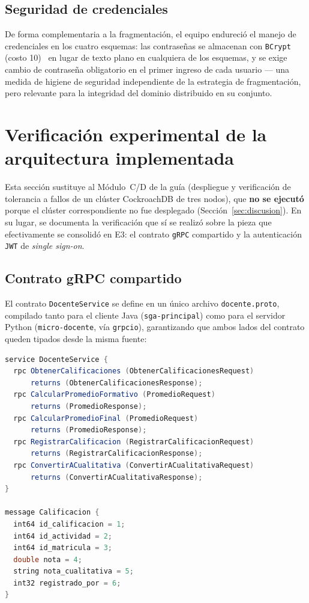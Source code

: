 \documentclass[12pt,a4paper]{article}
\begin{document}
\subsection{Seguridad de credenciales}

De forma complementaria a la fragmentación, el equipo endureció el manejo
de credenciales en los cuatro esquemas: las contraseñas se almacenan con
\texttt{BCrypt} (costo 10)~\cite{provos1999bcrypt} en lugar de texto plano
en cualquiera de los esquemas, y se exige cambio de contraseña obligatorio
en el primer ingreso de cada usuario --- una medida de higiene de seguridad
independiente de la estrategia de fragmentación, pero relevante para la
integridad del dominio distribuido en su conjunto.


\section{Verificación experimental de la arquitectura implementada}
\label{sec:verificacion-grpc}

Esta sección sustituye al Módulo~C/D de la guía (despliegue y verificación
de tolerancia a fallos de un clúster CockroachDB de tres nodos), que
\textbf{no se ejecutó} porque el clúster correspondiente no fue desplegado
(Sección~\ref{sec:discusion}). En su lugar, se documenta la verificación
que sí se realizó sobre la pieza que efectivamente se consolidó en E3: el
contrato \texttt{gRPC} compartido y la autenticación \texttt{JWT} de
\emph{single sign-on}.

\subsection{Contrato gRPC compartido}

El contrato \texttt{DocenteService} se define en un único archivo
\texttt{docente.proto}, compilado tanto para el cliente Java
(\texttt{sga-principal}) como para el servidor Python (\texttt{micro-docente},
vía \texttt{grpcio}), garantizando que ambos lados del contrato queden
tipados desde la misma fuente:

\begin{lstlisting}[style=codigo,language=Java,caption={Extracto de \texttt{docente.proto}: contrato compartido entre \texttt{sga-principal} (cliente) y \texttt{micro-docente} (servidor).}]
service DocenteService {
  rpc ObtenerCalificaciones (ObtenerCalificacionesRequest)
      returns (ObtenerCalificacionesResponse);
  rpc CalcularPromedioFormativo (PromedioRequest)
      returns (PromedioResponse);
  rpc CalcularPromedioFinal (PromedioRequest)
      returns (PromedioResponse);
  rpc RegistrarCalificacion (RegistrarCalificacionRequest)
      returns (RegistrarCalificacionResponse);
  rpc ConvertirACualitativa (ConvertirACualitativaRequest)
      returns (ConvertirACualitativaResponse);
}

message Calificacion {
  int64 id_calificacion = 1;
  int64 id_actividad = 2;
  int64 id_matricula = 3;
  double nota = 4;
  string nota_cualitativa = 5;
  int32 registrado_por = 6;
}
\end{lstlisting}
\end{document}
